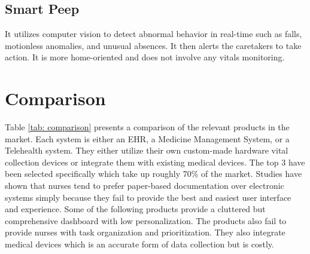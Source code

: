 \subsection{Smart Peep}
It utilizes computer vision to detect abnormal behavior in real-time such as falls, motionless anomalies, and unusual absences. It then alerts the caretakers to take action. It is more home-oriented and does not involve any vitals monitoring. 
\section{Comparison}
Table \ref{tab: comparison} presents a comparison of the relevant products in the market. Each system is either an EHR, a Medicine Management System, or a Telehealth system. They either utilize their own custom-made hardware vital collection devices or integrate them with existing medical devices. 
The top 3 have been selected specifically which take up roughly 70\% of the market. Studies have shown that nurses tend to prefer paper-based documentation over electronic systems simply because they fail to provide the best and easiest user interface and experience. Some of the following products provide a cluttered but comprehensive dashboard with low personalization.  The products also fail to provide nurses with task organization and prioritization. They also integrate medical devices which is an accurate form of data collection but is costly.

